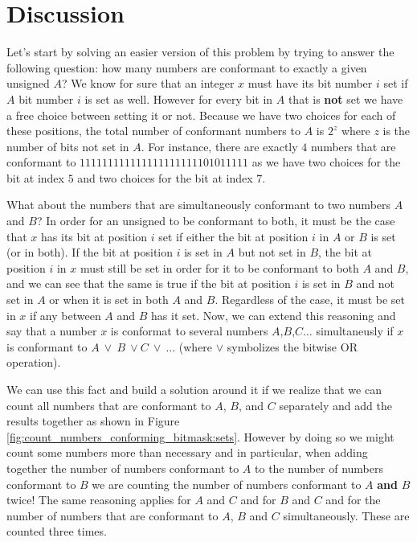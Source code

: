 \section{Discussion}
\label{count_numbers_conforming_bitmask:sec:discussion}
Let's start by solving an easier version of this problem by trying to answer the following question: how many numbers are conformant to exactly a given unsigned $A$?
We know for sure that an integer $x$ must have its bit number $i$ set if $A$ bit number $i$ is set as well. However for every bit in $A$  that is \textbf{not} set we have a free choice between setting it or not. 
Because we have two choices for each of these positions, the total number of conformant numbers to $A$ is $2^{z}$ where $z$ is the number of bits not set in $A$.
For instance, there are exactly $4$ numbers that are conformant to $11 1111 1111 1111 1111 1111 0101 1111$ as we have two choices for the bit at index $5$ and two choices for the bit at index $7$.

What about the numbers that are simultaneously conformant to two numbers $A$ and $B$? In order for an unsigned to be conformant to both, it must be the case that $x$ has its bit at position $i$ set if either the bit at position $i$ in $A$ or $B$ is set (or in both).
If the bit at position $i$ is set in $A$ but not set in $B$, the bit at position $i$ in $x$ must still be set in order for it to be conformant to both $A$ and $B$, and we can see that the same is true if the bit at position $i$ is set in $B$ and not set in $A$ or when it is set in both $A$ and $B$. Regardless of the case, it must be set in $x$ if any between $A$ and $B$ has it set.
Now, we can extend this reasoning and say that a number $x$ is conformat to several numbers $A$,$B$,$C\ldots$ simultaneusly if $x$ is conformant to $A \: \vee \: B \: \vee C \:  \vee \: \ldots$ (where $\vee$ symbolizes the bitwise OR operation).

We can use this fact and build a solution around it if we realize that we can count all numbers that are conformant to $A$, $B$, and $C$ separately and add the results together as shown in Figure \ref{fig:count_numbers_conforming_bitmask:sets}. However by doing so we might count some numbers more than necessary and in particular, when adding together the number of numbers conformant to $A$ to the number of numbers conformant to $B$ we are counting the number of numbers conformant to $A$ \textbf{and} $B$ twice! The same reasoning applies for $A$ and $C$ and for $B$ and $C$ and for the number of numbers that are conformant to $A$, $B$ and $C$ simultaneously. These are counted three times.

